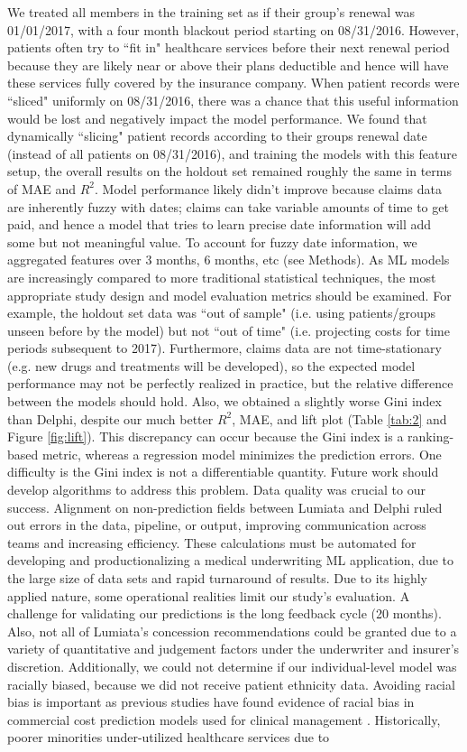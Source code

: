\documentclass[letterpaper]{article}
\begin{document}
We treated all members in the training set as if their group's renewal was 01/01/2017, with a four month blackout period starting on 08/31/2016. However, patients often try to ``fit in" healthcare services before their next renewal period because they are likely near or above their plans deductible and hence will have these services fully covered by the insurance company. When patient records were ``sliced" uniformly on 08/31/2016, there was a chance that this useful information would be lost and negatively impact the model performance. We found that dynamically ``slicing" patient records according to their groups renewal date (instead of all patients on 08/31/2016), and training the models with this feature setup, the overall results on the holdout set remained roughly the same in terms of MAE and $R^2$. Model performance likely didn't improve because claims data are inherently fuzzy with dates; claims can take variable amounts of time to get paid, and hence a model that tries to learn precise date information will add some but not meaningful value. To account for fuzzy date information, we aggregated features over 3 months, 6 months, etc (see Methods).  As ML models are increasingly compared to more traditional statistical techniques, the most appropriate study design and model evaluation metrics should be examined. For example, the holdout set data was ``out of sample" (i.e. using patients/groups unseen before by the model) but not ``out of time" (i.e. projecting costs for time periods subsequent to 2017).  Furthermore, claims data are not time-stationary (e.g. new drugs and treatments will be developed), so the expected model performance may not be perfectly realized in practice, but the relative difference between the models should hold. Also, we obtained a slightly worse Gini index than Delphi, despite our much better $R^2$, MAE, and lift plot (Table \ref{tab:2} and Figure \ref{fig:lift}).  This discrepancy can occur because the Gini index is a ranking-based metric, whereas a regression model minimizes the prediction errors. One difficulty is the Gini index is not a differentiable quantity. Future work should develop algorithms to address this problem.  Data quality was crucial to our success. Alignment on non-prediction fields between Lumiata and Delphi ruled out errors in the data, pipeline, or output, improving communication across teams and increasing efficiency. These calculations must be automated for developing and productionalizing a medical underwriting ML application, due to the large size of data sets and rapid turnaround of results.  Due to its highly applied nature, some operational realities limit our study's evaluation. A challenge for validating our predictions is the long feedback cycle (20 months). Also, not all of Lumiata's concession recommendations could be granted due to a variety of quantitative and judgement factors under the underwriter and insurer's discretion.  Additionally, we could not determine if our individual-level model was racially biased, because we did not receive patient ethnicity data.  Avoiding racial bias is important as previous studies have found evidence of racial bias in commercial cost prediction models used for clinical management \cite{RacialBias}.  Historically, poorer minorities under-utilized healthcare services due to 
\end{document}
